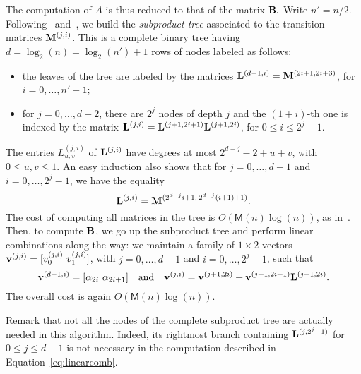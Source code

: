 \documentclass{elsart}
\def\M {\ensuremath{\mathsf{M}}}
\begin{document}
The computation of $A$ is thus reduced to that of the matrix ${\bf B}.$
Write $n'=n/2$. Following~\cite{Stone73} and~\cite{KoSt73}, we build
the {\it subproduct tree} associated to the transition matrices ${\bf
M}^{(j,i)}$. This is a complete binary tree having
$d=\log_2(n)=\log_2(n')+1$ rows of nodes labeled as follows:
\begin{itemize}
\item the leaves of the tree are labeled by the matrices
  ${\bf L}^{(d-1,i)}={\bf M}^{(2i+1,2i+3)}$, for $i=0,\dots,n'-1$;

\medskip

\item for $j=0,\dots,d-2$, there are $2^j$ nodes of depth $j$ and
  the $(1+i)$-th one is indexed by the matrix ${\bf L}^{(j,i)} =
  {\bf L}^{(j+1,2i+1)}{\bf L}^{(j+1,2i)}$, for $0\leq i \leq 2^j -1$.
\end{itemize}
The entries $L^{(j,i)}_{u,v}$ of ${\bf L}^{(j,i)}$ have degrees at
most $2^{d-j}-2+u+v$, with $0 \le u,v \le 1$. An easy induction also
shows that for $j=0,\dots,d-1$ and $i=0,\dots,2^j-1$, we have the
equality
$${\bf L}^{(j,i)} = {\bf M}^{(2^{d-j}i+1,\, 2^{d-j}(i+1)+1)}.$$ The
cost of computing all matrices in the tree is $O(\M(n)\log(n))$, as
in~\cite[Chapter 10]{GaGe99}. Then, to compute ${\bf B}$, we go up the
subproduct tree and perform linear combinations along the way: we
maintain a family of $1\times 2$ vectors ${\bf
v}^{(j,i)}=[v_0^{(j,i)}~v_1^{(j,i)}]$, with $j=0,\dots,d-1$ and
$i=0,\dots,2^j-1$, such that 
\begin{equation}\label{eq:linearcomb}
 {\bf
v}^{(d-1,i)}=[\alpha_{2i}~\alpha_{2i+1}] \quad\text{and}\quad {\bf
v}^{(j,i)} = {\bf v}^{(j+1,2i)} + {\bf v}^{(j+1,2i+1)} {\bf
L}^{(j+1,2i)}.
\end{equation}
The overall cost is again $O(\M(n)\log(n))$. 

Remark that not all the nodes of the complete subproduct tree are
actually needed in this algorithm. Indeed, its rightmost branch
containing ${\bf L}^{(j,2^j-1)}$ for $0\leq j \leq d-1$ is not
necessary in the computation described in
Equation~\eqref{eq:linearcomb}.
\end{document}
